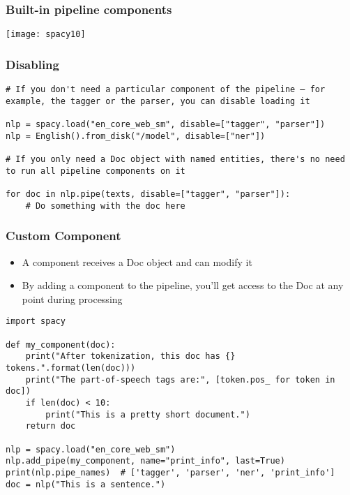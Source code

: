\begin{frame}[fragile]\frametitle{Built-in pipeline components}
\begin{center}
\texttt{[image: spacy10]}
\end{center}

\end{frame}

\begin{frame}[fragile]\frametitle{Disabling}
\begin{lstlisting}
# If you don't need a particular component of the pipeline – for example, the tagger or the parser, you can disable loading it
		
nlp = spacy.load("en_core_web_sm", disable=["tagger", "parser"])
nlp = English().from_disk("/model", disable=["ner"])

# If you only need a Doc object with named entities, there's no need to run all pipeline components on it

for doc in nlp.pipe(texts, disable=["tagger", "parser"]):
    # Do something with the doc here
\end{lstlisting}
	
	
\end{frame}

\begin{frame}[fragile]\frametitle{Custom Component}
  \begin{itemize}
    \item A component receives a Doc object and can modify it


\item  By adding a component to the pipeline, you'll get access to the Doc at any point during processing
  \end{itemize}
	
		\begin{lstlisting}
import spacy

def my_component(doc):
    print("After tokenization, this doc has {} tokens.".format(len(doc)))
    print("The part-of-speech tags are:", [token.pos_ for token in doc])
    if len(doc) < 10:
        print("This is a pretty short document.")
    return doc

nlp = spacy.load("en_core_web_sm")
nlp.add_pipe(my_component, name="print_info", last=True)
print(nlp.pipe_names)  # ['tagger', 'parser', 'ner', 'print_info']
doc = nlp("This is a sentence.")
\end{lstlisting}	
	
\end{frame}


